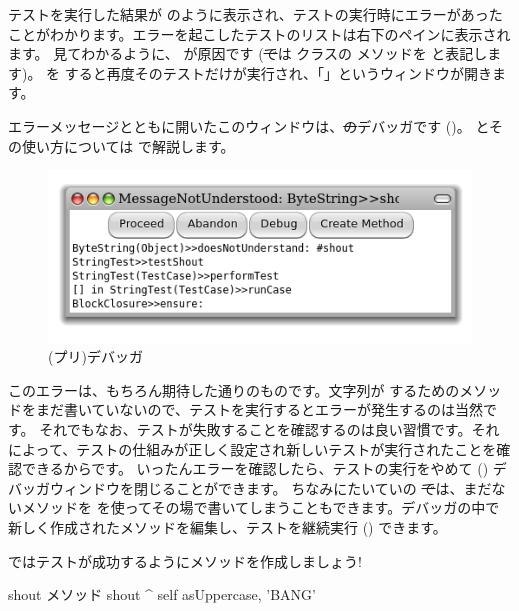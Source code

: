 \documentclass[a4paper,10pt,twoside]{book}
\begin{document}
テストを実行した結果が  のように表示され、テストの実行時にエラーがあったことがわかります。エラーを起こしたテストのリストは右下のペインに表示されます。 見てわかるように、 が原因です
(\st では  クラスの  メソッドを  と表記します)。
 を \click すると再度そのテストだけが実行され、「」というウィンドウが開きます。

エラーメッセージとともに開いたこのウィンドウは、\st のデバッガです ()。
とその使い方については  で解説します。

\begin{figure}[hbt]
\centerline {\includegraphics[width=\textwidth]{Predebugger}}
\caption{(プリ)デバッガ}
\end{figure}

このエラーは、もちろん期待した通りのものです。文字列が  するためのメソッドをまだ書いていないので、テストを実行するとエラーが発生するのは当然です。
それでもなお、テストが失敗することを確認するのは良い習慣です。それによって、テストの仕組みが正しく設定され新しいテストが実行されたことを確認できるからです。
いったんエラーを確認したら、テストの実行をやめて () デバッガウィンドウを閉じることができます。
ちなみにたいていの \st では、まだないメソッドを  を使ってその場で書いてしまうこともできます。デバッガの中で新しく作成されたメソッドを編集し、テストを継続実行 () できます。

ではテストが成功するようにメソッドを作成しましょう!

\begin{method}[shout]{shout メソッド}
shout
	^ self asUppercase, 'BANG'
\end{method}
\end{document}
